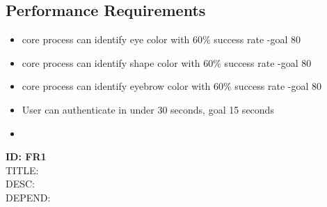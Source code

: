 \documentclass[onecolumn, draftclsnofoot,10pt, compsoc]{IEEEtran}
\begin{document}
	\subsection{Performance Requirements}
	\begin{itemize}
		\item core process can identify eye color with 60\% success rate -goal 80%
		\item core process can identify shape color with 60\% success rate -goal 80%
		\item core process can identify eyebrow color with 60\% success rate -goal 80%
		\item User can authenticate in under 30 seconds, goal 15 seconds
		\item 

		
	\end{itemize}
\textbf{ID: FR1} \\
	TITLE: \\
	DESC: \\
	DEPEND: \\

	\newpage
\end{document}
